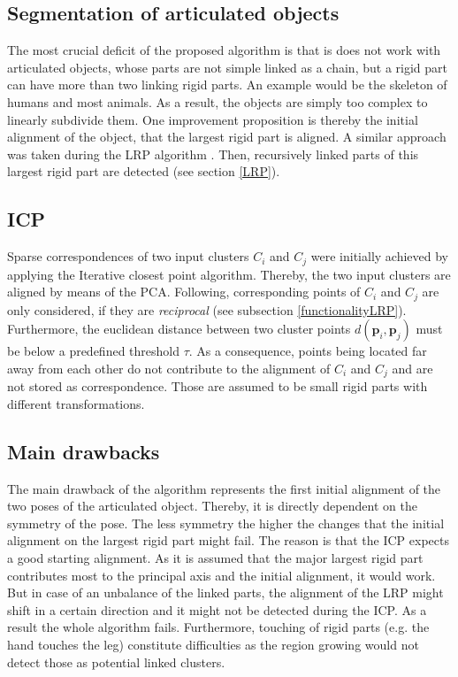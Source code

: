 \subsection{Segmentation of articulated objects}
The most crucial deficit  of the proposed algorithm is that is does not work with articulated objects, whose parts are not simple linked as a chain, but a rigid part can have more than two linking rigid parts. An example would be the skeleton of humans and most animals. As a result, the objects are simply too complex to linearly subdivide them. One improvement proposition is thereby the initial alignment of the object, that the largest rigid part is aligned.  A similar approach was taken during the LRP algorithm \cite{guo2016correspondence}. Then, recursively linked parts of this largest rigid part are detected (see section \ref{LRP}).

\subsection{ICP}
Sparse correspondences of two input clusters $C_i$ and $C_j$ were initially achieved by applying the Iterative closest point algorithm. Thereby, the two input clusters are aligned by means of the PCA. Following, corresponding points of $C_i$ and $C_j$ are only considered, if they are \textit{reciprocal} (see subsection \ref{functionalityLRP}). Furthermore, the euclidean distance between two cluster points $d(\boldsymbol{p}_i,\boldsymbol{p}_j)$ must be below a predefined threshold $\tau$. As a consequence, points being located far away from each other do not contribute to the alignment of $C_i$ and $C_j$ and are not stored as correspondence. Those are assumed to be small rigid parts with different transformations.

\subsection{Main drawbacks}
The main drawback of the algorithm represents the first initial alignment of the two poses of the articulated object. Thereby, it is directly dependent on the symmetry of the pose. The less symmetry the higher the changes that the initial alignment on the largest rigid part might fail. The reason is that the ICP expects a good starting alignment. As it is assumed that the major largest rigid part contributes most to the principal axis and the initial alignment, it would work. But in case of an unbalance of the linked parts, the alignment of the LRP might shift in a certain direction and it might not be detected during the ICP. As a result the whole algorithm fails. Furthermore, touching of rigid parts (e.g. the hand touches the leg) constitute difficulties as the region growing would not detect those as potential linked clusters. 
